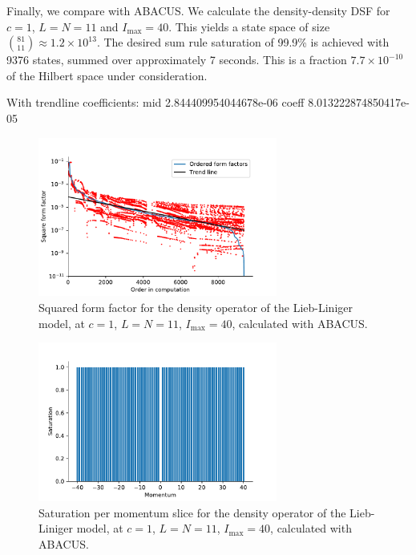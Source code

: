 \documentclass[11pt, a4paper]{report} %
\begin{document}
Finally, we compare with ABACUS.
We calculate the density-density DSF for \(c=1\), \(L=N=11\) and \(I_{\max}=40\).
This yields a state space of size \(\binom{81}{11}\approx 1.2\times 10^{13}\).
The desired sum rule saturation of 99.9\% is achieved with 9376 states, summed over approximately 7 seconds.
This is a fraction \(7.7\times 10^{-10}\) of the Hilbert space under consideration.

With trendline coefficients: mid 2.844409954044678e-06 coeff 8.013222874850417e-05

\begin{figure}[tb!]
  \centering
  \includegraphics[width=0.7\textwidth]{abacus_ff_sq.pdf}
  \caption{Squared form factor for the density operator of the Lieb-Liniger model, at \(c=1\), \(L=N=11\), \(I_{\max}=40\), calculated with ABACUS.}
  \label{fig:abacusformfactors}
\end{figure}

\begin{figure}[tb!]
  \centering
  \includegraphics[width=0.7\textwidth]{abacus_saturations.pdf}
  \caption{Saturation per momentum slice for the density operator of the Lieb-Liniger model, at \(c=1\), \(L=N=11\), \(I_{\max}=40\), calculated with ABACUS.}
\end{figure}
\end{document}
